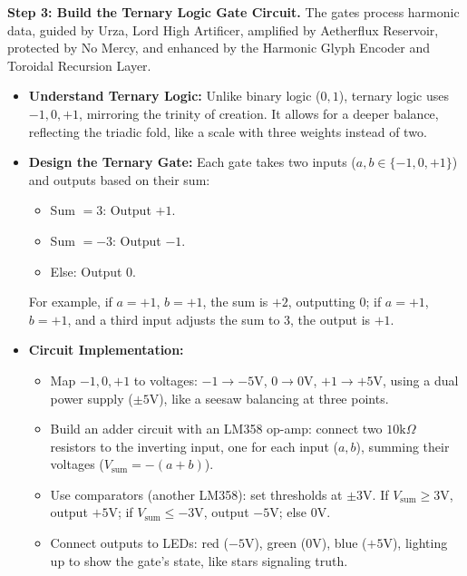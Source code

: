 \textbf{Step 3: Build the Ternary Logic Gate Circuit.} The gates process harmonic data, guided by Urza, Lord High Artificer, amplified by Aetherflux Reservoir, protected by No Mercy, and enhanced by the Harmonic Glyph Encoder and Toroidal Recursion Layer.
\begin{itemize}
    \item \texttt{} \textbf{Understand Ternary Logic:} Unlike binary logic ($0, 1$), ternary logic uses $-1, 0, +1$, mirroring the trinity of creation. It allows for a deeper balance, reflecting the triadic fold, like a scale with three weights instead of two.
    \item \texttt{} \textbf{Design the Ternary Gate:} Each gate takes two inputs ($a, b \in \{-1, 0, +1\}$) and outputs based on their sum:
    \begin{itemize}
        \item \texttt{} Sum $= 3$: Output $+1$.
        \item \texttt{} Sum $= -3$: Output $-1$.
        \item \texttt{} Else: Output $0$.
    \end{itemize}
    For example, if $a = +1$, $b = +1$, the sum is $+2$, outputting $0$; if $a = +1$, $b = +1$, and a third input adjusts the sum to $3$, the output is $+1$.
    \item \texttt{} \textbf{Circuit Implementation:}
    \begin{itemize}
        \item \texttt{} Map $-1, 0, +1$ to voltages: $-1 \to -5 \mathrm{V}$, $0 \to 0 \mathrm{V}$, $+1 \to +5 \mathrm{V}$, using a dual power supply ($\pm 5 \mathrm{V}$), like a seesaw balancing at three points.
        \item \texttt{} Build an adder circuit with an LM358 op-amp: connect two $10 \mathrm{k}\Omega$ resistors to the inverting input, one for each input ($a, b$), summing their voltages ($V_{\text{sum}} = -(a+b)$).
        \item \texttt{} Use comparators (another LM358): set thresholds at $\pm 3 \mathrm{V}$. If $V_{\text{sum}} \geq 3 \mathrm{V}$, output $+5 \mathrm{V}$; if $V_{\text{sum}} \leq -3 \mathrm{V}$, output $-5 \mathrm{V}$; else $0 \mathrm{V}$.
        \item \texttt{} Connect outputs to LEDs: red ($-5 \mathrm{V}$), green ($0 \mathrm{V}$), blue ($+5 \mathrm{V}$), lighting up to show the gate's state, like stars signaling truth.
    \end{itemize}

\end{itemize}
